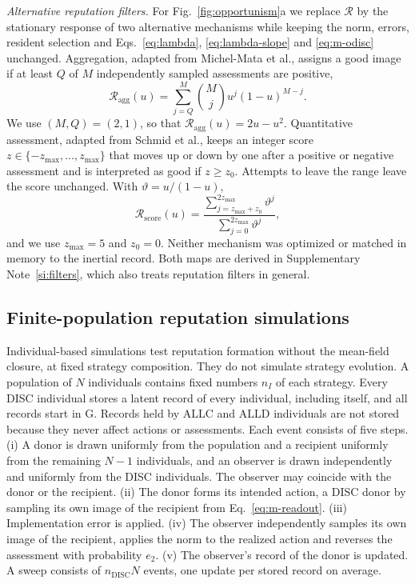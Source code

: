 \documentclass[10pt]{wlscirep}
\newcommand{\Rmap}{\mathscr{R}}            %
\newcommand{\st}[1]{\mathrm{#1}}           %
\newcommand{\DISC}{\mathrm{DISC}}
\theoremstyle{plain}
\theoremstyle{remark}
\begin{document}
\textit{Alternative reputation filters.} For Fig.~\ref{fig:opportunism}a we replace $\Rmap$ by the stationary response of two alternative mechanisms while keeping the norm, errors, resident selection and Eqs.~\eqref{eq:lambda}, \eqref{eq:lambda-slope} and \eqref{eq:m-odisc} unchanged. Aggregation, adapted from Michel-Mata et al.\cite{michelmata2024}, assigns a good image if at least $Q$ of $M$ independently sampled assessments are positive,
\begin{equation}
\Rmap_{\mathrm{agg}}(u)=\sum_{j=Q}^{M}\binom{M}{j}u^j(1-u)^{M-j}.
\label{eq:m-aggregation}
\end{equation}
We use $(M,Q)=(2,1)$, so that $\Rmap_{\mathrm{agg}}(u)=2u-u^2$. Quantitative assessment, adapted from Schmid et al.\cite{schmid2023}, keeps an integer score $z\in\{-z_{\max},\ldots,z_{\max}\}$ that moves up or down by one after a positive or negative assessment and is interpreted as good if $z\geq z_0$. Attempts to leave the range leave the score unchanged. With $\vartheta=u/(1-u)$,
\begin{equation}
\Rmap_{\mathrm{score}}(u)=\frac{\sum_{j=z_{\max}+z_0}^{2z_{\max}}\vartheta^j}{\sum_{j=0}^{2z_{\max}}\vartheta^j},
\label{eq:m-score}
\end{equation}
and we use $z_{\max}=5$ and $z_0=0$. Neither mechanism was optimized or matched in memory to the inertial record. Both maps are derived in Supplementary Note~\ref{si:filters}, which also treats reputation filters in general.

\subsection*{Finite-population reputation simulations}

Individual-based simulations test reputation formation without the mean-field closure, at fixed strategy composition. They do not simulate strategy evolution. A population of $N$ individuals contains fixed numbers $n_I$ of each strategy. Every DISC individual stores a latent record of every individual, including itself, and all records start in $\st G$. Records held by ALLC and ALLD individuals are not stored because they never affect actions or assessments. Each event consists of five steps. (i) A donor is drawn uniformly from the population and a recipient uniformly from the remaining $N-1$ individuals, and an observer is drawn independently and uniformly from the DISC individuals. The observer may coincide with the donor or the recipient. (ii) The donor forms its intended action, a DISC donor by sampling its own image of the recipient from Eq.~\eqref{eq:m-readout}. (iii) Implementation error is applied. (iv) The observer independently samples its own image of the recipient, applies the norm to the realized action and reverses the assessment with probability $e_2$. (v) The observer's record of the donor is updated. A sweep consists of $n_{\DISC}N$ events, one update per stored record on average.
\end{document}
